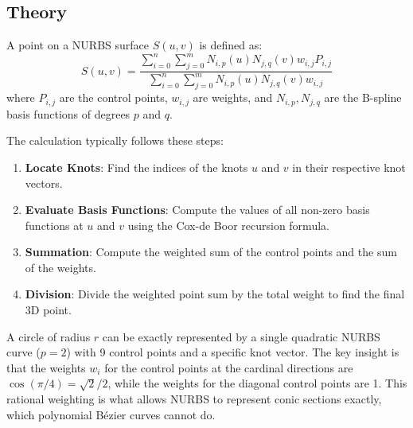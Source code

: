 \subsection{Theory}
A point on a NURBS surface $S(u, v)$ is defined as:
$$S(u, v) = \frac{\sum_{i=0}^n \sum_{j=0}^m N_{i,p}(u) N_{j,q}(v) w_{i,j} P_{i,j}}{\sum_{i=0}^n \sum_{j=0}^m N_{i,p}(u) N_{j,q}(v) w_{i,j}}$$
where $P_{i,j}$ are the control points, $w_{i,j}$ are weights, and $N_{i,p}, N_{j,q}$ are the B-spline basis functions of degrees $p$ and $q$.

The calculation typically follows these steps:
\begin{enumerate}
\item \textbf{Locate Knots}: Find the indices of the knots $u$ and $v$ in their respective knot vectors.
\item \textbf{Evaluate Basis Functions}: Compute the values of all non-zero basis functions at $u$ and $v$ using the Cox-de Boor recursion formula.
\item \textbf{Summation}: Compute the weighted sum of the control points and the sum of the weights.
\item \textbf{Division}: Divide the weighted point sum by the total weight to find the final 3D point.
\end{enumerate}

\begin{example}\label{ex:nurbs_circle}
A circle of radius $r$ can be exactly represented by a single quadratic NURBS curve ($p = 2$) with 9 control points and a specific knot vector. The key insight is that the weights $w_i$ for the control points at the cardinal directions are $\cos(\pi/4) = \sqrt{2}/2$, while the weights for the diagonal control points are 1. This rational weighting is what allows NURBS to represent conic sections exactly, which polynomial B\'ezier curves cannot do.
\end{example}

